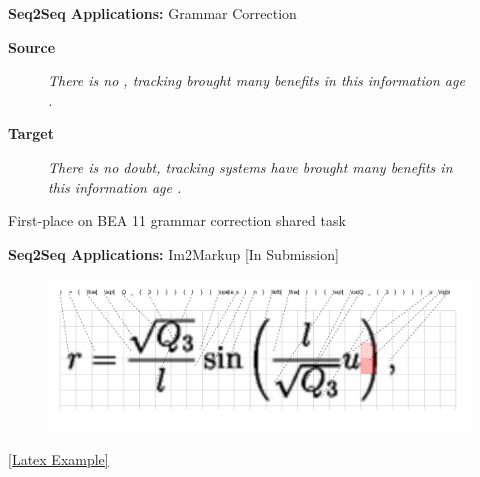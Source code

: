 \documentclass{beamer}
\let\tempone\itemize
\let\temptwo\enditemize
\renewenvironment{itemize}{\tempone\addtolength{\itemsep}{0.5\baselineskip}}{\temptwo}
\newcommand{\mair}{\vspace{-0.25cm}}
\newcommand{\Cite}[1]{{\footnotesize \citep{#1}}}
\begin{document}
\begin{frame}
  \centerline{\textbf{Seq2Seq Applications:} \alert{Grammar Correction} \Cite{Schmaltz2016} }
  
  \begin{center}
    \textbf{Source}
  \end{center}
  
  \begin{figure}
    \textit{There is no , tracking  brought many benefits in this information
age . }
  \end{figure}

  \begin{center}
    \textbf{Target}
  \end{center}
  \mair

  \begin{figure}
    \centering
    \textit{There is no doubt, tracking systems have
      brought many benefits in this information
      age . }
  \end{figure}

  \begin{itemize}
  \item First-place on BEA 11 grammar correction shared task \Cite{Daudaravicius2016}
  \end{itemize}
\end{frame}


\begin{frame}
  \centerline{\textbf{Seq2Seq Applications:} \alert{Im2Markup} [In Submission] }
  
  
  \begin{figure}
    \includegraphics[width=\textwidth]{math}
  \end{figure}

  \mair

  \begin{figure}
    \centering
  \end{figure}
  \centerline{\href{http://localhost:8900/}{[Latex Example]}}
\end{frame}
\end{document}
